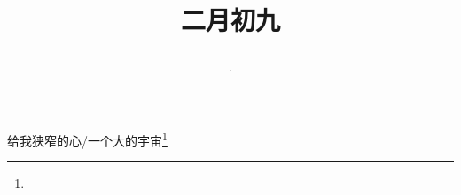 \title{\date[d=18,m=3,y=2024][year:cn-y,年,month:cn,day:cn,日,·,weekday]·二月初九 }
给我狭窄的心/一个大的宇宙\footnote{ }

